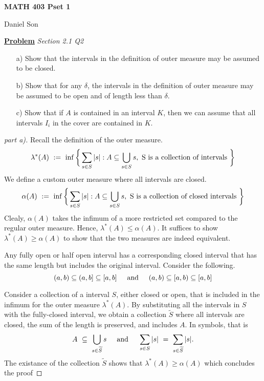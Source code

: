 \documentclass{article}
\newcommand{\new}[2]{
    \vspace{2mm}
    \noindent
    \textbf{
    \underline{#1}}
    \textit{{#2}}
    \
}
\newcommand{\textAnd}{
    {
        \hspace{5mm}
        \textrm{and}
        \hspace{5mm}
    }
}
\begin{document}
\begin{center}
    \Large
    \textbf{MATH 403 Pset 1}

    \large
    Daniel Son
\end{center}

\new{Problem} {Section 2.1 Q2}
\begin{enumerate}
    \item[a)] Show that the intervals in the definition of outer measure may be assumed to be closed.
    \item[b)] Show that for any $\delta$, the intervals in the definition of outer measure may be assumed to be open and of length less than $\delta$.
    \item[c)] Show that if $A$ is contained in an interval $K$, then we can assume that all intervals $I_i$ in the cover are contained in $K$.
\end{enumerate}

\begin{proof}[part a)]
Recall the definition of the outer measure. 
\begin{equation}
    \lambda^*(A) \ := \ 
    \inf \bigg\{
        \sum_{s \in S} |s| :
        A \subseteq \bigcup_{s \in S} s, 
        \textnormal{
            S is a collection of intervals
        }
        \bigg\}
\end{equation}
We define a custom outer measure where all intervals are closed. 
\begin{equation}
    \alpha(A) \ := \ 
    \inf \bigg\{
        \sum_{s \in S} |s| :
        A \subseteq \bigcup_{s \in S} s, 
        \textnormal{
            S is a collection of closed intervals
        }
        \bigg\}
\end{equation}
Clealy, $\alpha(A)$ takes the infimum of a more restricted set compared to the regular outer measure. Hence, $\lambda^*(A) \leq \alpha(A)$. It suffices to show $\lambda^*(A) \geq \alpha(A)$ to show that the two measures are indeed equivalent. 

Any fully open or half open interval has a corresponding closed interval that has the same length but includes the original interval. Consider the following. 
\begin{equation}
    (a, b) \subseteq (a, b] \subseteq [a, b] \textAnd
    (a, b) \subseteq [a, b) \subseteq [a, b] 
\end{equation}

Consider a collection of a interval $S$, either closed or open, that is included in the infimum for the outer measure $\lambda^*(A)$. By substituting all the intervals in $S$ with the fully-closed interval, we obtain a collection $\widetilde S$ where all intervals are closed, the sum of the length is preserved, and includes $A$. 
In symbols, that is 
\begin{eqnarray}
    A \ \subseteq \ \bigcup_{s \in \widetilde S} s \textAnd
    \sum_{s \in S} |s| \ = \ \sum_{s \in \widetilde S}|s|.
\end{eqnarray}
The existance of the collection $\widetilde S$ shows that  $\lambda^*(A) \geq \alpha(A)$ which concludes the proof 
\end{proof}
\end{document}

